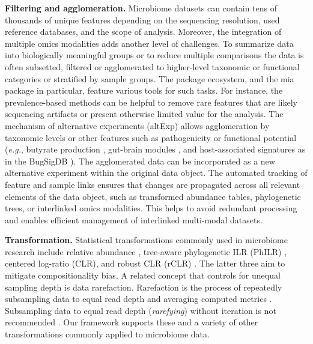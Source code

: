 \documentclass[
  sn-nature,
]{sn-jnl}
\begin{document}
\textbf{Filtering and agglomeration.} Microbiome datasets can contain
tens of thousands of unique features depending on the sequencing
resolution, used reference databases, and the scope of analysis.
Moreover, the integration of multiple omics modalities adds another
level of challenges. To summarize data into biologically meaningful
groups or to reduce multiple comparisons the data is often subsetted,
filtered or agglomerated to higher-level taxonomic or functional
categories or stratified by sample groups. The package ecosystem, and
the mia package in particular, feature various tools for such tasks. For
instance, the prevalence-based methods can be helpful to remove rare
features that are likely sequencing artifacts or present otherwise
limited value for the analysis. The mechanism of alternative experiments
(altExp) allows agglomeration by taxonomic levels or other features such
as pathogenicity or functional potential (\emph{e.g.}, butyrate
production \citep{kullberg2024}, gut-brain modules
\citep{vallescolomer2019}, and host-associated signatures as in the
BugSigDB \citep{geistlinger2024}). The agglomerated data can be
incorporated as a new alternative experiment within the original data
object. The automated tracking of feature and sample links ensures that
changes are propagated across all relevant elements of the data object,
such as transformed abundance tables, phylogenetic trees, or interlinked
omics modalities. This helps to avoid redundant processing and enables
efficient management of interlinked multi-modal datasets.

\textbf{Transformation.} Statistical transformations commonly used in
microbiome research include relative abundance \citep{gloor2017},
tree-aware phylogenetic ILR (PhILR) \citep{silverman2017}, centered
log-ratio (CLR), and robust CLR (rCLR) \citep{martino2019}. The latter
three aim to mitigate compositionality bias. A related concept that
controls for unequal sampling depth is data rarefaction. Rarefaction is
the process of repeatedly subsampling data to equal read depth and
averaging computed metrics \citep{schloss2024b}. Subsampling data to
equal read depth (\emph{rarefying}) without iteration is not recommended
\citep{mcmurdie2014, schloss2024, willis2019b}. Our framework supports
these and a variety of other transformations commonly applied to
microbiome data.
\end{document}
